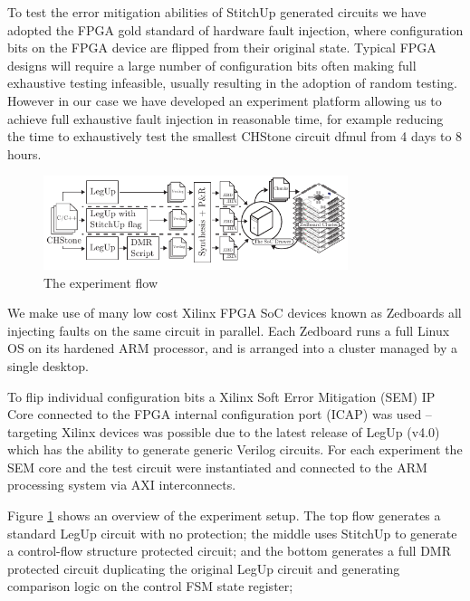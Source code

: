 
To test the error mitigation abilities of StitchUp generated circuits we have adopted the
FPGA gold standard of hardware fault injection, where configuration bits on the 
FPGA device are flipped from their original state.
Typical FPGA designs will require a large number of configuration bits often making
full exhaustive testing infeasible, usually resulting in the adoption of random
testing.
However in our case we have developed an experiment
platform allowing us to achieve full exhaustive fault injection in reasonable time,
for example reducing the time to exhaustively test the smallest CHStone circuit dfmul from 4 days
to 8 hours.

\begin{figure}[t]
\centering
\includegraphics[width=3.5in]{./imgs/ExperimentFlow.pdf}
\caption{The experiment flow}
\label{fig:ExperimentFlow}
\end{figure}

We make use of many low cost Xilinx FPGA SoC devices known as
Zedboards all injecting faults on the same circuit in parallel.
Each Zedboard runs a full Linux OS on its hardened ARM processor, and is arranged into
a cluster managed by a single desktop.%

To flip individual configuration bits a Xilinx Soft Error Mitigation (SEM) IP Core
connected to the FPGA internal configuration port (ICAP) was used --
targeting Xilinx devices was possible due to the latest release of LegUp
(v4.0) which has the ability to generate generic Verilog circuits.
For each experiment the SEM core and the test circuit were instantiated and connected to the
ARM processing system via AXI interconnects.

Figure \ref{fig:ExperimentFlow} shows an overview of the experiment setup.
The top flow generates a standard LegUp circuit with no protection;
the middle uses StitchUp to generate a control-flow structure protected circuit;
and the bottom generates a full DMR protected circuit duplicating the original LegUp
circuit and generating comparison logic on the control FSM state register;

